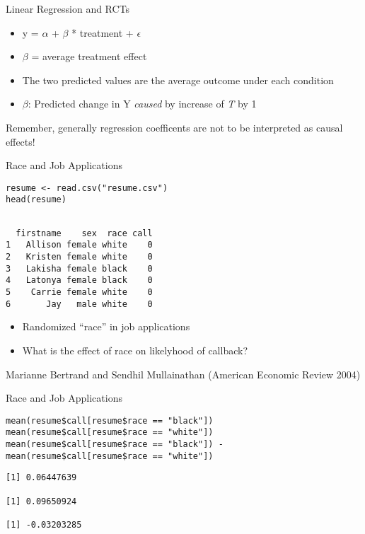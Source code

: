 \documentclass[presentation]{beamer}
\begin{document}
\begin{frame}[label={sec:org57df42e}]{Linear Regression and RCTs}
\begin{itemize}
\item y = \(\alpha\) + \(\beta\) * treatment + \(\epsilon\)

\item \(\beta\) = average treatment effect

\item The two predicted values are the average outcome under each condition
\end{itemize}

\pause

\begin{itemize}
\item \(\beta\): Predicted change in Y \emph{caused} by increase of \emph{T} by 1
\end{itemize}

\pause

\alert{Remember, generally regression coefficents are not to be interpreted as causal effects!}
\end{frame}

\begin{frame}[fragile,shrink=20,label={sec:org3aea0f2}]{Race and Job Applications}
 \begin{verbatim}
resume <- read.csv("resume.csv")
head(resume)
\end{verbatim}

\begin{verbatim}

  firstname    sex  race call
1   Allison female white    0
2   Kristen female white    0
3   Lakisha female black    0
4   Latonya female black    0
5    Carrie female white    0
6       Jay   male white    0
\end{verbatim}

\begin{itemize}
\item Randomized ``race'' in job applications
\item What is the effect of race on likelyhood of callback?
\end{itemize}

\alert{Marianne Bertrand and Sendhil Mullainathan (American Economic Review 2004)}
\end{frame}

\begin{frame}[fragile,shrink=30,label={sec:org99c9f48}]{Race and Job Applications}
 \begin{verbatim}
mean(resume$call[resume$race == "black"])
mean(resume$call[resume$race == "white"])
mean(resume$call[resume$race == "black"]) - mean(resume$call[resume$race == "white"])
\end{verbatim}

\begin{verbatim}
[1] 0.06447639

[1] 0.09650924

[1] -0.03203285
\end{verbatim}
\end{frame}
\end{document}
